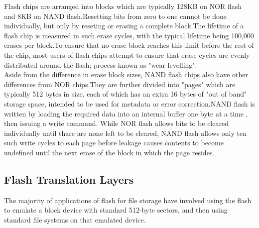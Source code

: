 \documentclass[conference]{IEEEtran}
\begin{document}
Flash chips are arranged into blocks which are typically 128KB on NOR flash and 8KB on 
NAND flash.Resetting bits from zero to one cannot be done individually, but only by 
reseting or erasing a complete block.The lifetime of a flash chip is measured in such erase
cycles, with the typical lifetime being 100,000 erases per block.To ensure that no erase 
block reaches this limit before the rest of the chip, most users of flash chips attempt
to ensure that erase cycles are evenly distributed around the flash; process known as
"wear levelling".\\

Aside from the difference in erase block sizes, NAND flash chips also have other differences from
NOR chips.They are further divided into "pages" which are typically 512 bytes in size,
each of which has an extra 16 bytes of "out of band" storage space, intended to be used
for metadata or error correction.NAND flash is written by loading the required data into an 
internal buffer one byte at a time , then issuing a write command. While NOR flash allows
bits to be cleared individually until thare are none left to be cleared, NAND flash 
allows only ten such write cycles to each page before leakage causes contents to become 
undefined until the next erase of the block in which the page resides.





 

\subsection{Flash Translation Layers} 

The majority of applications of flash for file storage have involved
using the flash to emulate a block device with standard 512-byte sectors, and then 
using standard file systems on that emulated device.\\
\end{document}
